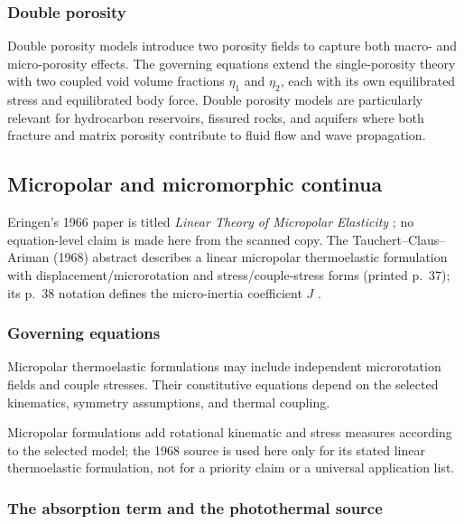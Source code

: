 \subsubsection{Double porosity}

Double porosity models introduce two porosity fields to capture both macro- and micro-porosity effects. The governing equations extend the single-porosity theory with two coupled void volume fractions $\eta_1$ and $\eta_2$, each with its own equilibrated stress and equilibrated body force. Double porosity models are particularly relevant for hydrocarbon reservoirs, fissured rocks, and aquifers where both fracture and matrix porosity contribute to fluid flow and wave propagation.

\subsection{Micropolar and micromorphic continua}
\label{sec:5.5}

Eringen's 1966 paper is titled \emph{Linear Theory of Micropolar Elasticity} \cite{Eringen1966a}; no equation-level claim is made here from the scanned copy. The Tauchert--Claus--Ariman (1968) abstract describes a linear micropolar thermoelastic formulation with displacement/microrotation and stress/couple-stress forms (printed p.~37); its p.~38 notation defines the micro-inertia coefficient $J$ \cite{TauchertClausAriman1968}.

\subsubsection{Governing equations}

Micropolar thermoelastic formulations may include independent microrotation fields and couple stresses. Their constitutive equations depend on the selected kinematics, symmetry assumptions, and thermal coupling.

Micropolar formulations add rotational kinematic and stress measures according to the selected model; the 1968 source is used here only for its stated linear thermoelastic formulation, not for a priority claim or a universal application list.

\subsubsection{The absorption term and the photothermal source}

